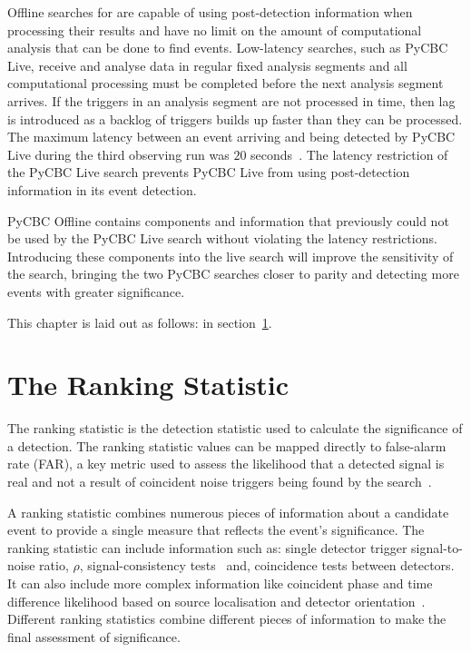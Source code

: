 Offline searches for \gws are capable of using post-detection information when processing their results and have no limit on the amount of computational analysis that can be done to find events. Low-latency \gwadj searches, such as PyCBC Live, receive and analyse data in regular fixed analysis segments and all computational processing must be completed before the next analysis segment arrives. If the triggers in an analysis segment are not processed in time, then lag is introduced as a backlog of triggers builds up faster than they can be processed. The maximum latency between an event arriving and being detected by PyCBC Live during the third observing run was $20$ seconds~\cite{PyCBC:2017}. The latency restriction of the PyCBC Live search prevents PyCBC Live from using post-detection information in its event detection.

PyCBC Offline contains components and information that previously could not be used by the PyCBC Live search without violating the latency restrictions. Introducing these components into the live search will improve the sensitivity of the \gwadj search, bringing the two PyCBC searches closer to parity and detecting more \gwadj events with greater significance.


This chapter is laid out as follows: in section~\ref{}.

\section{\label{5:sec:ranking-stat}The Ranking Statistic}

The ranking statistic is the detection statistic used to calculate the significance of a \gwadj detection. The ranking statistic values can be mapped directly to false-alarm rate (FAR), a key metric used to assess the likelihood that a detected signal is real and not a result of coincident noise triggers being found by the \gwadj search~\cite{PyCBC_global:2020}.

A ranking statistic combines numerous pieces of information about a candidate event to provide a single measure that reflects the event's significance. The ranking statistic can include information such as: single detector trigger signal-to-noise ratio, $\rho$, signal-consistency tests~\cite{Allen_Chi:2005, rw_snr_eq:2012, PyCBC_sg:2018} and, coincidence tests between detectors. It can also include more complex information like coincident phase and time difference likelihood based on source localisation and detector orientation~\cite{PyCBC:2017, PyCBC_singles:2022}. Different ranking statistics combine different pieces of information to make the final assessment of significance.


